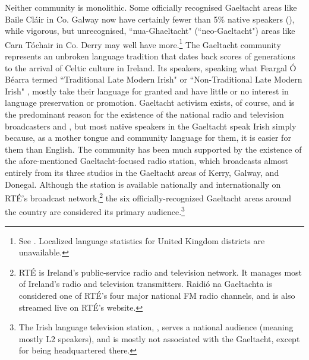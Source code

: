 \documentclass[output=paper,colorlinks,citecolor=brown]{langscibook}
\begin{document}
Neither community is monolithic. Some officially recognised Gaeltacht areas like Baile Cláir in Co. Galway now have certainly fewer than 5\% native speakers (\citealt{ob:OCinnseala2020}), while vigorous, but unrecognised, ``nua-Ghaeltacht" (``neo-Gaeltacht") areas like Carn Tóchair in Co. Derry may well have more.\footnote{See \citet{ob:Armstrong2012}. Localized language statistics for United Kingdom districts are unavailable.} The Gaeltacht community represents an unbroken language tradition that dates back scores of generations to the arrival of Celtic culture in Ireland. Its speakers, speaking what Feargal Ó Béarra termed ``Traditional Late Modern Irish" or ``Non-Trad\-ition\-al Late Modern Irish" \citep{ob:OBearra2007}, mostly take their language for granted and have little or no interest in language preservation or promotion. Gaeltacht activism exists, of course, and is the predominant reason for the existence of the national radio and television broadcasters  and  \citep[742--745]{ob:Watson2002}, but most native speakers in the Gaeltacht speak Irish simply because, as a mother tongue and community language for them, it is easier for them than English. The community has been much supported by the existence of the afore-mentioned Gaeltacht-focused radio station, which broadcasts almost entirely from its three studios in the Gaeltacht areas of Kerry, Galway, and Donegal. Although the station is available nationally and internationally on RTÉ's broadcast network,\footnote{RTÉ is Ireland's public-service radio and television network. It manages most of Ireland's radio and television transmitters. Raidió na Gaeltachta is considered one of RTÉ's four major national FM radio channels, and is also streamed live on RTÉ's website.} the six officially-recognized Gaeltacht areas around the country are considered its primary audience.\footnote{The Irish language television station, , serves a national audience (meaning mostly L2 speakers), and is mostly not associated with the Gaeltacht, except for being headquartered there.}
\end{document}

